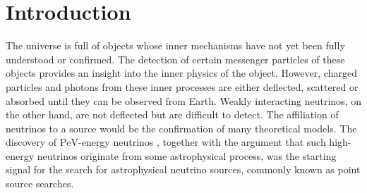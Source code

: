 \chapter{Introduction}
%
%
The universe is full of objects whose inner mechanisms have not yet been fully understood or confirmed.
The detection of certain messenger particles of these objects provides an insight into the inner physics of the object.
However, charged particles and photons from these inner processes are either deflected, scattered or absorbed until they can be observed from Earth.
Weakly interacting neutrinos, on the other hand, are not deflected but are difficult to detect.
The affiliation of neutrinos to a source would be the confirmation of many theoretical models.
The discovery of $\si{\peta\electronvolt}$-energy neutrinos \cite{pev_neutrino}, together with the argument that such high-energy neutrinos originate from some astrophysical process, was the starting signal for the search for astrophysical neutrino sources, commonly known as point source searches.

